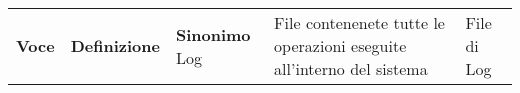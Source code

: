 \begin{center}

    \begin{tabularx}{\textwidth}
        {|c|>{\raggedright}X|l|}

        \hline {}
        \Large\textbf{Voce} & \Large\centering\textbf{Definizione}                                  & \Large\textbf{Sinonimo} %
        \n Log              & File contenenete tutte le operazioni eseguite all'interno del sistema & File di Log
        \n
    \end{tabularx}
\end{center}
